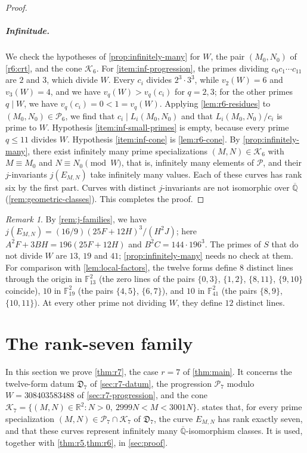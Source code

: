 \documentclass[12pt,oneside,openany]{book}
\theoremstyle{definition}
\theoremstyle{plain}
\numberwithin{equation}{chapter}
\theoremstyle{plain}
\theoremstyle{definition}
\theoremstyle{remark}
\newtheorem{remark}[remark]{Remark}
\newcommand{\F}{\mathbb F}
\newcommand{\R}{\mathbb R}
\newcommand{\Qbar}{\overline{\mathbb Q}}
\newcommand{\datum}{\mathfrak D}
\newcommand{\cP}{\mathcal P}
\newcommand{\cK}{\mathcal K}
\begin{document}
\begin{proof}
\paragraph{Infinitude.} We check the hypotheses of \cref{prop:infinitely-many} for $W$, the pair $(M_0,N_0)$ of \eqref{r6:crt}, and the cone $\cK_6$. For \ref{item:inf-progression}, the primes dividing $c_0c_1\cdots c_{11}$ are $2$ and $3$, which divide $W$. Every $c_i$ divides $2^3\cdot3^3$, while $v_2(W)=6$ and $v_3(W)=4$, and we have $v_q(W)>v_q(c_i)$ for $q=2,3$; for the other primes $q\mid W$, we have $v_q(c_i)=0<1=v_q(W)$. Applying \cref{lem:r6-residues} to $(M_0,N_0)\in\cP_6$, we find that $c_i\mid L_i(M_0,N_0)$ and that $L_i(M_0,N_0)/c_i$ is prime to $W$. Hypothesis \ref{item:inf-small-primes} is empty, because every prime $q\le11$ divides $W$. Hypothesis \ref{item:inf-cone} is \cref{lem:r6-cone}. By \cref{prop:infinitely-many}, there exist infinitely many prime specializations $(M,N)\in\cK_6$ with $M\equiv M_0$ and $N\equiv N_0\pmod W$, that is, infinitely many elements of $\cP$, and their $j$-invariants $j(E_{M,N})$ take infinitely many values. Each of these curves has rank six by the first part. Curves with distinct $j$-invariants are not isomorphic over $\Qbar$ (\cref{rem:geometric-classes}). This completes the proof.
\end{proof}

\begin{remark}\label{rem:r6-j}
By \cref{rem:j-families}, we have $j(E_{M,N})=(16/9)(25F+12H)^3/(H^2J)$; here $A^2F+3BH=196(25F+12H)$ and $B^2C=144\cdot196^3$. The primes of $S$ that do not divide $W$ are $13$, $19$ and $41$; \cref{prop:infinitely-many} needs no check at them. For comparison with \cref{lem:local-factors}, the twelve forms define $8$ distinct lines through the origin in $\F_{13}^2$ (the zero lines of the pairs $\{0,3\}$, $\{1,2\}$, $\{8,11\}$, $\{9,10\}$ coincide), $10$ in $\F_{19}^2$ (the pairs $\{4,5\}$, $\{6,7\}$), and $10$ in $\F_{41}^2$ (the pairs $\{8,9\}$, $\{10,11\}$). At every other prime not dividing $W$, they define $12$ distinct lines.
\end{remark}
\chapter{The rank-seven family}\label{sec:rank7}

In this section we prove \cref{thm:r7}, the case $r=7$ of \cref{thm:main}.
It concerns the twelve-form datum $\datum_7$ of \cref{sec:r7-datum}, the
progression $\cP_7$ modulo $W=308403583488$ of \cref{sec:r7-progression},
and the cone $\cK_7=\{(M,N)\in\R^2:N>0,\ 2999N<M<3001N\}$. 
states that, for every prime specialization $(M,N)\in\cP_7\cap\cK_7$ of
$\datum_7$, the curve $E_{M,N}$ has rank exactly seven, and that these
curves represent infinitely many $\Qbar$-isomorphism classes. It is used, together
with \cref{thm:r5,thm:r6}, in \cref{sec:proof}.
\end{document}
